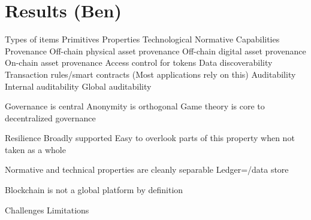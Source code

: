 \section{Results (Ben)}

Types of items
	Primitives
	Properties
		Technological
		Normative
	Capabilities
		Provenance
			Off-chain physical asset provenance
			Off-chain digital asset provenance
			On-chain asset provenance
		Access control for tokens
		Data discoverability
		Transaction rules/smart contracts
			(Most applications rely on this)
		Auditability
			Internal auditability
			Global auditability
		
		
Governance is central
Anonymity is orthogonal
Game theory is core to decentralized governance

Resilience
	Broadly supported
	Easy to overlook parts of this property when not taken as a whole

Normative and technical properties are cleanly separable
Ledger=/data store

Blockchain is not a global platform by definition


Challenges
Limitations